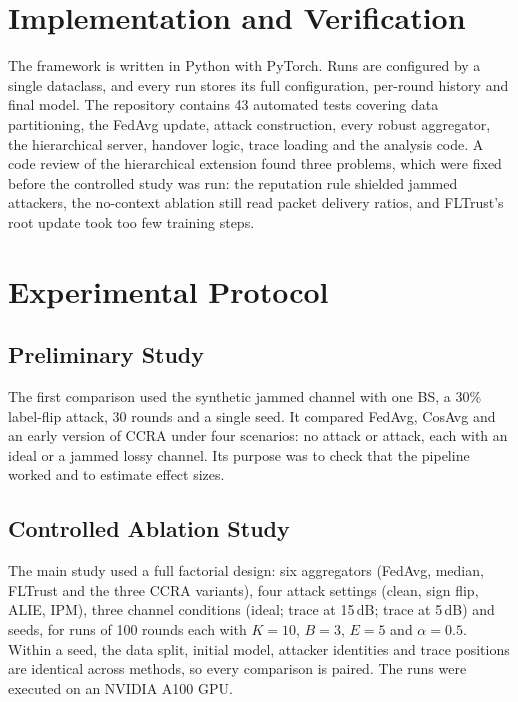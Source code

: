\section{Implementation and Verification}
The framework is written in Python with PyTorch. Runs are configured by a single
dataclass, and every run stores its full configuration, per-round history and final
model. The repository contains 43 automated tests covering data partitioning, the
FedAvg update, attack construction, every robust aggregator, the hierarchical server,
handover logic, trace loading and the analysis code. A code review of the
hierarchical extension found three problems, which were fixed before the controlled
study was run: the reputation rule shielded jammed attackers, the no-context
ablation still read packet delivery ratios, and FLTrust's root update took too few
training steps.

\section{Experimental Protocol}
\subsection{Preliminary Study}
The first comparison used the synthetic jammed channel with one BS, a 30\% label-flip
attack, 30 rounds and a single seed. It compared FedAvg, CosAvg and an early version
of CCRA under four scenarios: no attack or attack, each with an ideal or a jammed
lossy channel. Its purpose was to check that the pipeline worked and to estimate
effect sizes.

\subsection{Controlled Ablation Study}
\label{sec:protocol}
The main study used a full factorial design: six aggregators (FedAvg, median,
FLTrust and the three CCRA variants), four attack settings (clean, sign flip, ALIE,
IPM), three channel conditions (ideal; trace at 15\,dB; trace at 5\,dB) and
\NumSeeds{} seeds, for \NumRuns{} runs of 100 rounds each with $K=10$, $B=3$, $E=5$
and $\alpha=0.5$. Within a seed, the data split, initial model, attacker identities
and trace positions are identical across methods, so every comparison is paired. The
runs were executed on an NVIDIA A100 GPU.

